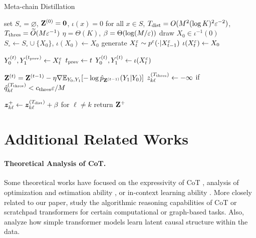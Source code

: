 
\begin{algorithm}[t]
\caption{Meta-chain Distillation}
\label{alg:distill}
\begin{algorithmic}[1]
\STATE set $S_\circ=\varnothing$, $\mathbf{Z}^{(0)}=\boldsymbol{0}$, $\iota(x)=0$ for all $x\in S$,
\STATE $T_{\operatorname{dist}}=O(M^2(\log K)^2\varepsilon^{-2})$, $T_{\operatorname{thres}}=\widetilde{O}(M\varepsilon^{-1})$
\STATE $\eta=\Theta(K)$, $\beta=\Theta(\log (M/\varepsilon))$
\STATE draw $X_0\in\iota^{-1}(0)$
\STATE $S_\circ\gets S_\circ\cup\{X_0\}$, $\iota(X_0)\gets X_0$
\STATE generate $X_t^\varepsilon\sim p^\varepsilon(\cdot|X_{t-1}^\varepsilon)$
\STATE $\iota(X_t^\varepsilon)\gets X_0$
\ENDFOR
\ENDWHILE

\STATE $Y_0^{(t)}, Y_1^{(t_{\operatorname{prev}})}\gets X_t^\varepsilon$
\STATE $t_{\operatorname{prev}}\gets t$
\ELSE
\STATE $Y_0^{(t)},Y_1^{(t)}\gets \iota(X_t^\varepsilon)$
\ENDIF
\ENDFOR

\STATE $\mathbf{Z}^{(t)} = \mathbf{Z}^{(t-1)} - \eta\nabla \mathbb{E}_{Y_0,Y_1}[-\log\hat{p}_{\mathbf{Z}^{(t-1)}}(Y_1|Y_0)]$
\STATE $z_{k\ell}^{(T_{\operatorname{thres}})} \gets -\infty$ if $\hat{q}_{k\ell}^{(T_{\operatorname{thres}})} < c_{\operatorname{thres}}\varepsilon/M$
\ENDIF
\ENDFOR

\STATE $\bm{z}_{k\ell}^+ \gets \bm{z}_{k\ell}^{(T_{\operatorname{dist}})} + \beta$ for $\ell\ne k$ 
\STATE return $\mathbf{Z}^+$
\end{algorithmic}
\end{algorithm}

\bigskip 

\section{Additional Related Works}\label{app:related}

\paragraph{Theoretical Analysis of CoT.} Some theoretical works have focused on the expressivity of CoT \citep{Feng23,merrill2023expresssive,Chiang23,li2024chain}, analysis of optimization and estimation ability \citep{Li24how,Hu24,kim2024transformers}, or in-context learning ability \citep{Li23,Satwik24}. More closely related to our paper, \citet{sanford24log,sanford2024understanding, abbe2024far} study the algorithmic reasoning capabilities of CoT or scratchpad transformers for certain computational or graph-based tasks. Also, \citet{Nichani24} analyze how simple transformer models learn latent causal structure within the data.

